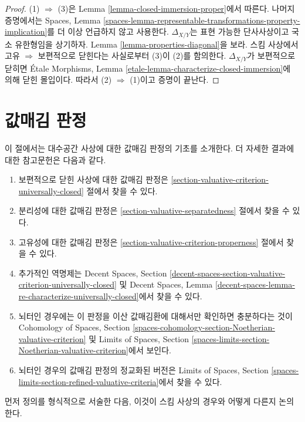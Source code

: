 \begin{proof}
(1) $\Rightarrow$ (3)은 Lemma \ref{lemma-closed-immersion-proper}에서 따른다.
나머지 증명에서는 Spaces, Lemma
\ref{spaces-lemma-representable-transformations-property-implication}를
더 이상 언급하지 않고 사용한다.
$\Delta_{X/Y}$는 표현 가능한 단사사상이고 국소 유한형임을 상기하자.
Lemma \ref{lemma-properties-diagonal}을 보라.
스킴 사상에서 고유 $\Rightarrow$ 보편적으로 닫힌다는 사실로부터 (3)이 (2)를
함의한다.
$\Delta_{X/Y}$가 보편적으로 닫히면
\'Etale Morphisms, Lemma
\ref{etale-lemma-characterize-closed-immersion}에 의해 닫힌 몰입이다.
따라서 (2) $\Rightarrow$ (1)이고 증명이 끝난다.
\end{proof}










\section{값매김 판정}
\label{section-valuative}

\noindent
이 절에서는 대수공간 사상에 대한 값매김 판정의 기초를 소개한다.
더 자세한 결과에 대한 참고문헌은 다음과 같다.
\begin{enumerate}
\item 보편적으로 닫힌 사상에 대한 값매김 판정은
\ref{section-valuative-criterion-universally-closed} 절에서 찾을 수 있다.
\item 분리성에 대한 값매김 판정은
\ref{section-valuative-separatedness} 절에서 찾을 수 있다.
\item 고유성에 대한 값매김 판정은
\ref{section-valuative-criterion-properness} 절에서 찾을 수 있다.
\item 추가적인 역명제는 Decent Spaces, Section
\ref{decent-spaces-section-valuative-criterion-universally-closed} 및 Decent Spaces, Lemma
\ref{decent-spaces-lemma-re-characterize-universally-closed}에서 찾을 수 있다.
\item 뇌터인 경우에는 이 판정을 이산 값매김환에 대해서만 확인하면 충분하다는 것이
Cohomology of Spaces, Section
\ref{spaces-cohomology-section-Noetherian-valuative-criterion} 및
Limits of Spaces, Section
\ref{spaces-limits-section-Noetherian-valuative-criterion}에서 보인다.
\item 뇌터인 경우의 값매김 판정의 정교화된 버전은 Limits of Spaces, Section
\ref{spaces-limits-section-refined-valuative-criteria}에서 찾을 수 있다.
\end{enumerate}
먼저 정의를 형식적으로 서술한 다음, 이것이 스킴 사상의 경우와 어떻게 다른지
논의한다.

